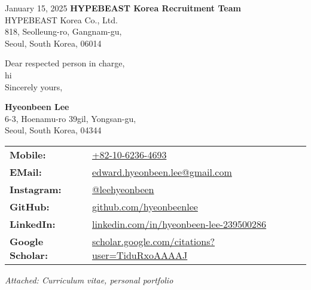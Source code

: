 \documentclass[a4paper,10pt]{extarticle}
\begin{document}
\pagestyle{empty}

\begin{spacing}{1.2}
	\normalsize January 15, 2025 \hfill\large\textbf{HYPEBEAST Korea Recruitment Team}\\
	\normalsize \null\hfill HYPEBEAST Korea Co., Ltd.\\
	\normalsize \null\hfill 818, Seolleung-ro, Gangnam-gu,\\
	\null\hfill Seoul, South Korea, 06014
\end{spacing}

Dear respected person in charge,\\

hi\\

Sincerely yours,\\

\begin{spacing}{1.2}
	\textbf{\large Hyeonbeen Lee}\\
	\normalsize
	6-3, Hoenamu-ro 39gil, Yongsan-gu,\\
	Seoul, South Korea, 04344
\end{spacing}
\small
\begin{tabular}{@{}ll}
	\textbf{Mobile: }         & \href{tel:+82-10-6236-4693}{+82-10-6236-4693}                                                                 \\
	\textbf{EMail: }          & \href{mailto:edward.hyeonbeen.lee@gmail.com}{edward.hyeonbeen.lee@gmail.com}                                  \\
	\textbf{Instagram: }      & \href{https://www.instagram.com/leehyeonbeen}{@leehyeonbeen}                                                  \\
	\textbf{GitHub: }         & \href{https://github.com/hyeonbeenlee}{github.com/hyeonbeenlee}                                               \\
	\textbf{LinkedIn: }       & \href{https://www.linkedin.com/in/hyeonbeen-lee-239500286/}{linkedin.com/in/hyeonbeen-lee-239500286}          \\
	\textbf{Google Scholar: } & \href{https://scholar.google.com/citations?user=TiduRxoAAAAJ}{scholar.google.com/citations?user=TiduRxoAAAAJ} \\
\end{tabular}
\newline\newline
\large\textit{Attached: Curriculum vitae, personal portfolio}
\end{document}
